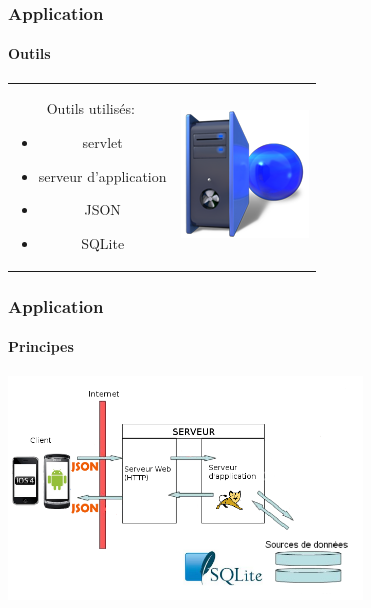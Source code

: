 \begin{frame}
\frametitle{Application}
\framesubtitle{Outils}
	\begin{center}
		\begin{tabular}{cc}
			\begin{minipage}{7cm}
			
			\begin{block}{Outils utilisés: }
				\begin{itemize}
				  \item servlet
				  \item serveur d'application
				  \item JSON
				  \item SQLite
				\end{itemize}
			\end{block}
			
			\end{minipage}&
			
			\begin{minipage}{4cm}
				\includegraphics[scale=0.5]{img/serveur.png} 
			\end{minipage}\\
				
			\end{tabular}
	\end{center}
			
\end{frame}


\begin{frame}
\frametitle{Application}
\framesubtitle{Principes}

	\begin{center}
		\includegraphics[width=9.4cm]{img/4.png} 
	\end{center}
	

\end{frame}
